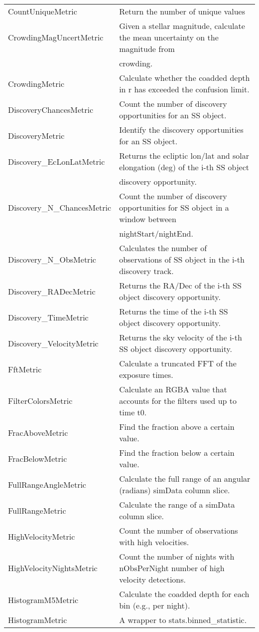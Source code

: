 \begin{table}
\begin{tabular}{ll}
 CountUniqueMetric &  Return the number of unique values \\
 CrowdingMagUncertMetric &  Given a stellar magnitude, calculate the mean uncertainty on the magnitude from \\
  &  crowding. \\
 CrowdingMetric &  Calculate whether the coadded depth in r has exceeded the confusion limit. \\
 DiscoveryChancesMetric &  Count the number of discovery opportunities for an SS object. \\
 DiscoveryMetric &  Identify the discovery opportunities for an SS object. \\
 Discovery\_EcLonLatMetric &  Returns the ecliptic lon/lat and solar elongation (deg) of the i-th SS object \\
  &  discovery opportunity. \\
 Discovery\_N\_ChancesMetric &  Count the number of discovery opportunities for SS object in a window between \\
  &  nightStart/nightEnd. \\
 Discovery\_N\_ObsMetric &  Calculates the number of observations of SS object in the i-th discovery track. \\
 Discovery\_RADecMetric &  Returns the RA/Dec of the i-th SS object discovery opportunity. \\
 Discovery\_TimeMetric &  Returns the time of the i-th SS object discovery opportunity. \\
 Discovery\_VelocityMetric &  Returns the sky velocity of the i-th SS object discovery opportunity. \\
 FftMetric &  Calculate a truncated FFT of the exposure times. \\
 FilterColorsMetric &  Calculate an RGBA value that accounts for the filters used up to time t0. \\
 FracAboveMetric &  Find the fraction above a certain value. \\
 FracBelowMetric &  Find the fraction below a certain value. \\
 FullRangeAngleMetric &  Calculate the full range of an angular (radians) simData column slice. \\
 FullRangeMetric &  Calculate the range of a simData column slice. \\
 HighVelocityMetric &  Count the number of observations with high velocities. \\
 HighVelocityNightsMetric &  Count the number of nights with nObsPerNight number of high velocity detections. \\
 HistogramM5Metric &  Calculate the coadded depth for each bin (e.g., per night). \\
 HistogramMetric &  A wrapper to stats.binned\_statistic. \\
\hline
\end{tabular}

\end{table}
